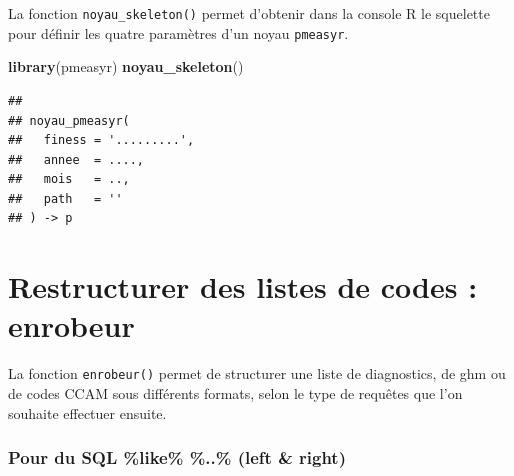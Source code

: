 \documentclass[]{book}
\newenvironment{Shaded}{\begin{snugshade}}{\end{snugshade}}
\newcommand{\CharTok}[1]{\textcolor[rgb]{0.31,0.60,0.02}{#1}}
\newcommand{\DataTypeTok}[1]{\textcolor[rgb]{0.13,0.29,0.53}{#1}}
\newcommand{\KeywordTok}[1]{\textcolor[rgb]{0.13,0.29,0.53}{\textbf{#1}}}
\newcommand{\NormalTok}[1]{#1}
\newcommand{\OperatorTok}[1]{\textcolor[rgb]{0.81,0.36,0.00}{\textbf{#1}}}
\newcommand{\StringTok}[1]{\textcolor[rgb]{0.31,0.60,0.02}{#1}}
\begin{document}
La fonction \texttt{noyau\_skeleton()} permet d'obtenir dans la console R le squelette pour définir les quatre paramètres d'un noyau \texttt{pmeasyr}.

\begin{Shaded}
\begin{Highlighting}[]
\KeywordTok{library}\NormalTok{(pmeasyr)}
\KeywordTok{noyau_skeleton}\NormalTok{()}
\end{Highlighting}
\end{Shaded}

\begin{verbatim}
## 
## noyau_pmeasyr(
##   finess = '.........',
##   annee  = ....,
##   mois   = ..,
##   path   = ''
## ) -> p
\end{verbatim}

\hypertarget{restructurer-des-listes-de-codes-enrobeur}{%
\chapter{Restructurer des listes de codes : enrobeur}\label{restructurer-des-listes-de-codes-enrobeur}}

La fonction \texttt{enrobeur()} permet de structurer une liste de diagnostics, de ghm ou de codes CCAM sous différents formats, selon le type de requêtes que l'on souhaite effectuer ensuite.

\hypertarget{pour-du-sql-like-..-left-right}{%
\subsection{Pour du SQL \%like\% \%..\% (left \& right)}\label{pour-du-sql-like-..-left-right}}

\begin{Shaded}
\end{Shaded}
\end{document}
